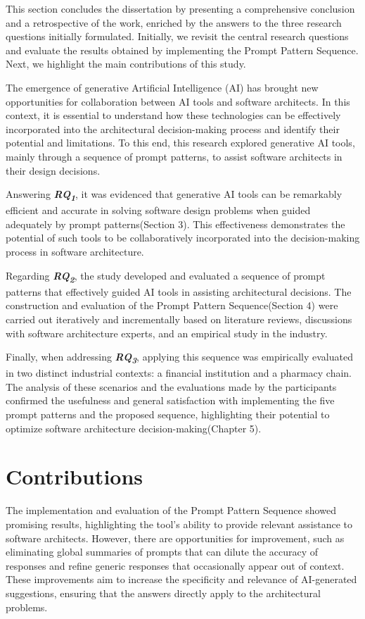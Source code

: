 This section concludes the dissertation by presenting a comprehensive conclusion and a retrospective of the work, enriched by the answers to the three research questions initially formulated. Initially, we revisit the central research questions and evaluate the results obtained by implementing the Prompt Pattern Sequence. Next, we highlight the main contributions of this study.

The emergence of generative Artificial Intelligence (AI) has brought new opportunities for collaboration between AI tools and software architects. In this context, it is essential to understand how these technologies can be effectively incorporated into the architectural decision-making process and identify their potential and limitations. To this end, this research explored generative AI tools, mainly through a sequence of prompt patterns, to assist software architects in their design decisions.

Answering \textbf{\textit{RQ\textsubscript{1}}}, it was evidenced that generative AI tools can be remarkably efficient and accurate in solving software design problems when guided adequately by prompt patterns(Section 3). This effectiveness demonstrates the potential of such tools to be collaboratively incorporated into the decision-making process in software architecture.

Regarding \textbf{\textit{RQ\textsubscript{2}}}, the study developed and evaluated a sequence of prompt patterns that effectively guided AI tools in assisting architectural decisions. The construction and evaluation of the Prompt Pattern Sequence(Section 4) were carried out iteratively and incrementally based on literature reviews, discussions with software architecture experts, and an empirical study in the industry.

Finally, when addressing \textbf{\textit{RQ\textsubscript{3}}}, applying this sequence was empirically evaluated in two distinct industrial contexts: a financial institution and a pharmacy chain. The analysis of these scenarios and the evaluations made by the participants confirmed the usefulness and general satisfaction with implementing the five prompt patterns and the proposed sequence, highlighting their potential to optimize software architecture decision-making(Chapter 5).

\section{Contributions}
The implementation and evaluation of the Prompt Pattern Sequence showed promising results, highlighting the tool's ability to provide relevant assistance to software architects. However, there are opportunities for improvement, such as eliminating global summaries of prompts that can dilute the accuracy of responses and refine generic responses that occasionally appear out of context. These improvements aim to increase the specificity and relevance of AI-generated suggestions, ensuring that the answers directly apply to the architectural problems.

